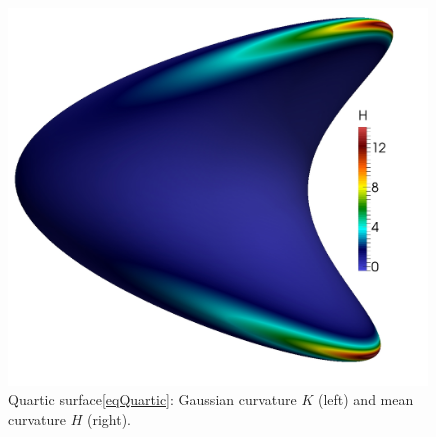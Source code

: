 \begin{description}
\begin{figure}
\begin{minipage}[htp]{.23\textwidth}
      \includegraphics[width=0.99\textwidth]{bilder/quartic/H.jpg}
    \end{minipage}
    \caption{Quartic surface\eqref{eqQuartic}: Gaussian curvature \( K \) (left) and mean curvature \( H \) (right).}
    \label{figQuartic}
  \end{figure}


\end{description}
